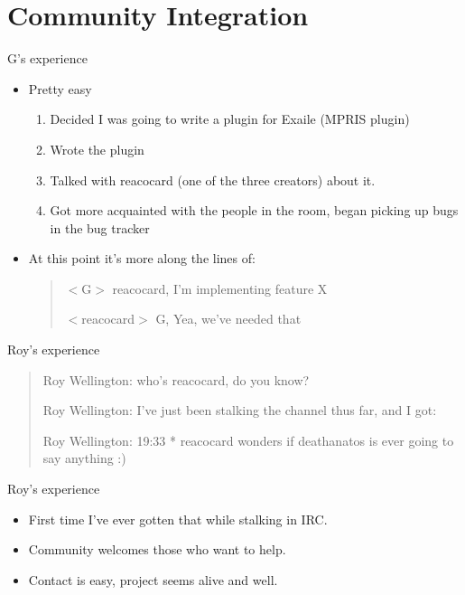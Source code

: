 \documentclass{beamer}
\begin{document}
\section{Community Integration}
\begin{frame}{G's experience}
  \begin{itemize}
    \item Pretty easy
    \begin{enumerate}
      \item Decided I was going to write a plugin for Exaile (MPRIS plugin)
      \item Wrote the plugin
      \item Talked with reacocard (one of the three creators) about it.
      \item Got more acquainted with the people in the room, began picking
        up bugs in the bug tracker
    \end{enumerate}
    \item At this point it's more along the lines of:
\begin{verse}
  $<$G$>$ reacocard, I'm implementing feature X

  $<$reacocard$>$ G, Yea, we've needed that
\end{verse}
  \end{itemize}
\end{frame}

\begin{frame}{Roy's experience}
\begin{quote}
Roy Wellington: who's reacocard, do you know?

Roy Wellington: I've just been stalking the channel thus far, and I got:

Roy Wellington: 19:33  * reacocard wonders if deathanatos is ever going to say anything :)
\end{quote}
\end{frame}

\begin{frame}{Roy's experience}
  \begin{itemize}
    \item First time I've ever gotten that while stalking in IRC.
	\item Community welcomes those who want to help.
	\item Contact is easy, project seems alive and well.
  \end{itemize}
\end{frame}
\end{document}
